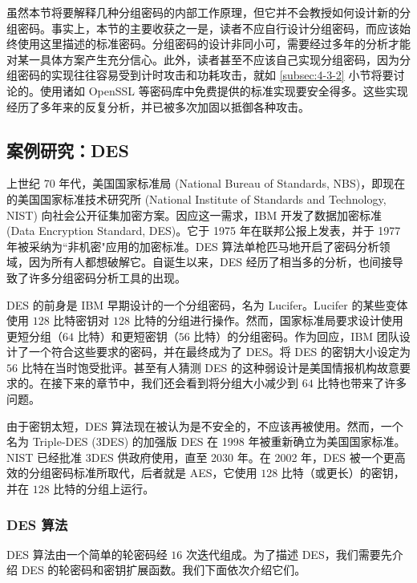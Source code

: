\begin{snote}[注意事项。]
虽然本节将要解释几种分组密码的内部工作原理，但它并不会教授如何设计新的分组密码。事实上，本节的主要收获之一是，读者不应自行设计分组密码，而应该始终使用这里描述的标准密码。分组密码的设计非同小可，需要经过多年的分析才能对某一具体方案产生充分信心。此外，读者甚至不应该自己实现分组密码，因为分组密码的实现往往容易受到计时攻击和功耗攻击，就如 \ref{subsec:4-3-2} 小节将要讨论的。使用诸如 OpenSSL 等密码库中免费提供的标准实现要安全得多。这些实现经历了多年来的反复分析，并已被多次加固以抵御各种攻击。
\end{snote}

\subsection{案例研究：DES}\label{subsec:4-2-1}

上世纪 70 年代，美国国家标准局 (National Bureau of Standards, NBS)，即现在的美国国家标准技术研究所 (National Institute of Standards and Technology, NIST) 向社会公开征集加密方案。因应这一需求，IBM 开发了数据加密标准 (Data Encryption Standard, DES)。它于 1975 年在联邦公报上发表，并于 1977 年被采纳为``非机密"应用的加密标准。DES 算法单枪匹马地开启了密码分析领域，因为所有人都想破解它。自诞生以来，DES 经历了相当多的分析，也间接导致了许多分组密码分析工具的出现。

DES 的前身是 IBM 早期设计的一个分组密码，名为 Lucifer。Lucifer 的某些变体使用 $128$ 比特密钥对 $128$ 比特的分组进行操作。然而，国家标准局要求设计使用更短分组（$64$ 比特）和更短密钥（$56$ 比特）的分组密码。作为回应，IBM 团队设计了一个符合这些要求的密码，并在最终成为了 DES。将 DES 的密钥大小设定为 $56$ 比特在当时饱受批评。甚至有人猜测 DES 的这种弱设计是美国情报机构故意要求的。在接下来的章节中，我们还会看到将分组大小减少到 $64$ 比特也带来了许多问题。

由于密钥太短，DES 算法现在被认为是不安全的，不应该再被使用。然而，一个名为 Triple-DES (3DES) 的加强版 DES 在 1998 年被重新确立为美国国家标准。NIST 已经批准 3DES 供政府使用，直至 2030 年。在 2002 年，DES 被一个更高效的分组密码标准所取代，后者就是 AES，它使用 $128$ 比特（或更长）的密钥，并在 $128$ 比特的分组上运行。

\subsubsection{DES 算法}\label{subsubsec:4-2-1-1}

DES 算法由一个简单的轮密码经 $16$ 次迭代组成。为了描述 DES，我们需要先介绍 DES 的轮密码和密钥扩展函数。我们下面依次介绍它们。

